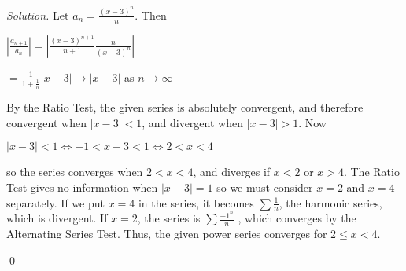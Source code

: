 \documentclass[10pt]{article}
\begin{document}
\begin{normalsize}
     \noindent \textit{Solution.}
     {Let} $a_n= \frac{(x-3)^n}{n}$. {Then}
     
     \begin{center} $\left|\frac{a_{n+1}}{a_n}\right|=\left|\frac{(x-3)^{n+1}}{n+1} \frac{n}{{(x-3)}^n}\right|$\end{center}
            
   \begin{center}
       
   $=\frac{1}{1+\frac{1}{n}}\left|{x-3}\right| \to\left|{x-3}\right| $ {as}
    $n\to \infty $ 
    \end{center}
\end{normalsize}

    \newpage
    \begin{normalsize}
        {By the Ratio Test, the given series is absolutely convergent, and therefore convergent when $\left|{x-3}\right| < 1$, and divergent when $\left|{x-3}\right| > 1$. Now}
        \begin{center}
            $\left|{x-3}\right| < 1 \iff -1<x-3<1 \iff 2<x<4$
        \end{center}
       {so the series converges when $2 < x < 4$, and diverges if $x < 2$ or $x > 4$. The Ratio Test gives no information when  $\left|{x-3}\right|=1$ so we must consider $x = 2$ and $x = 4$ separately. If we put $x = 4$ in the series, it becomes $\sum\frac{1}{n}$, the harmonic series, which is divergent. If $x = 2$, the series is $\sum\frac{{-1}^n}{n}$ , which converges by the Alternating Series Test. Thus, the given power series converges for $2\leq x < 4$.}
    \end{normalsize}
    \qed\\
    
\end{document}
